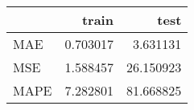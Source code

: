 \begin{tabular}{lrr}
\toprule
{} &     train &       test \\
\midrule
MAE  &  0.703017 &   3.631131 \\
MSE  &  1.588457 &  26.150923 \\
MAPE &  7.282801 &  81.668825 \\
\bottomrule
\end{tabular}
